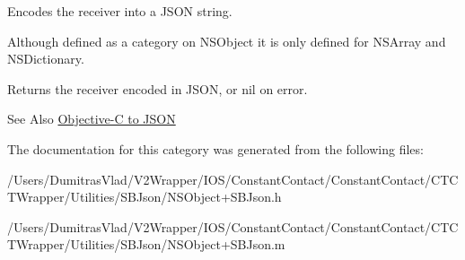 Encodes the receiver into a J\-S\-O\-N string. 

Although defined as a category on N\-S\-Object it is only defined for N\-S\-Array and N\-S\-Dictionary.

\begin{DoxyReturn}{Returns}
the receiver encoded in J\-S\-O\-N, or nil on error.
\end{DoxyReturn}
\begin{DoxySeeAlso}{See Also}
\hyperlink{objc2json}{Objective-\/\-C to J\-S\-O\-N} 
\end{DoxySeeAlso}


The documentation for this category was generated from the following files\-:\begin{DoxyCompactItemize}
\item 
/\-Users/\-Dumitras\-Vlad/\-V2\-Wrapper/\-I\-O\-S/\-Constant\-Contact/\-Constant\-Contact/\-C\-T\-C\-T\-Wrapper/\-Utilities/\-S\-B\-Json/N\-S\-Object+\-S\-B\-Json.\-h\item 
/\-Users/\-Dumitras\-Vlad/\-V2\-Wrapper/\-I\-O\-S/\-Constant\-Contact/\-Constant\-Contact/\-C\-T\-C\-T\-Wrapper/\-Utilities/\-S\-B\-Json/N\-S\-Object+\-S\-B\-Json.\-m\end{DoxyCompactItemize}

